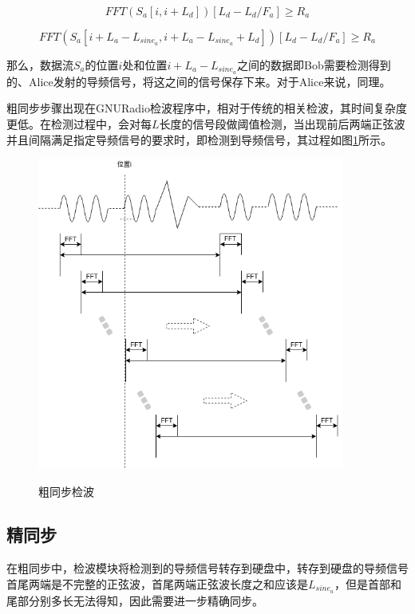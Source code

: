 \documentclass[master]{seuthesis} %
\begin{document}
\begin{Main}
\begin{equation}
    FFT(S_a[i, i+L_d])[L_d - L_d / F_a] \geq R_a 
\end{equation}

\begin{equation}
    FFT(S_a[i+L_a-L_{sine_a}, i+L_a-L_{sine_a}+L_d])[L_d - L_d / F_a] \geq R_a 
\end{equation}

那么，数据流$S_a$的位置$i$处和位置$i+L_a-L_{sine_a}$之间的数据即Bob需要检测得到的、Alice发射的导频信号，将这之间的信号保存下来。对于Alice来说，同理。

粗同步步骤出现在GNURadio检波程序中，相对于传统的相关检波，其时间复杂度更低。在检测过程中，会对每$L$长度的信号段做阈值检测，当出现前后两端正弦波并且间隔满足指定导频信号的要求时，即检测到导频信号，其过程如图\ref{detect_wave_algm}所示。

\begin{figure}
    \centering
    \includegraphics[width=0.9\textwidth]{images/detect_wave_algm}
    \caption{粗同步检波}{} %
    \label{detect_wave_algm}
\end{figure}


\subsection{精同步}

在粗同步中，检波模块将检测到的导频信号转存到硬盘中，转存到硬盘的导频信号首尾两端是不完整的正弦波，首尾两端正弦波长度之和应该是$L_{sine_a}$，但是首部和尾部分别多长无法得知，因此需要进一步精确同步。


\end{Main}
\end{document}
